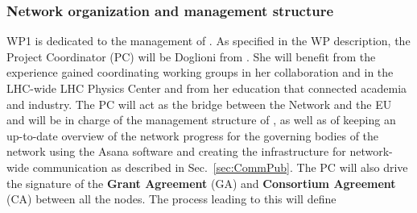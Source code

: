 

\subsubsection{Network organization and management structure}
\label{sub:networkOrganization}

WP1 is dedicated to the management of \acronym. As specified in the WP description, the Project Coordinator (PC) will be Doglioni from \lundentity. She will benefit from the experience gained 
coordinating working groups in her collaboration and in the LHC-wide LHC Physics Center and from her education that connected academia and industry.
The PC will act as the bridge between the Network and the EU and will
be in charge of the management structure of \acronym, as well as of
keeping an up-to-date overview of the network progress for the
governing bodies of the network using the Asana software and creating
the infrastructure for network-wide communication as described
in Sec.~\ref{sec:CommPub}. The PC will also drive the signature
of the \textbf{Grant Agreement} (GA) and \textbf{Consortium Agreement}
(CA) between all the nodes. The process leading to this will define
